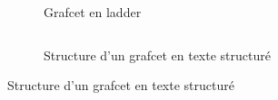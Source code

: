 \begin{figure}[h]
  \begin{subfigure}{0.3\textwidth}
    
    \caption{Grafcet en ladder}
  \end{subfigure}
  \hfill
  \begin{subfigure}{0.65\textwidth}
    \inputminted{C}{texteStructure/structureGrafcet.c}
    \caption{Structure d'un grafcet en texte structuré}
  \end{subfigure}
  \caption{Structure d'un grafcet en texte structuré}
  \label{fig:grafcetSFC-ST}
\end{figure}
